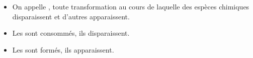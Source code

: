 \begin{mybilan}
	\begin{itemize}
		\item On appelle , toute transformation au cours de laquelle des espèces chimiques disparaissent et d'autres apparaissent.
		\item Les  sont consommés, ils disparaissent.
		\item Les  sont formés, ils apparaissent.
	\end{itemize}
\end{mybilan}